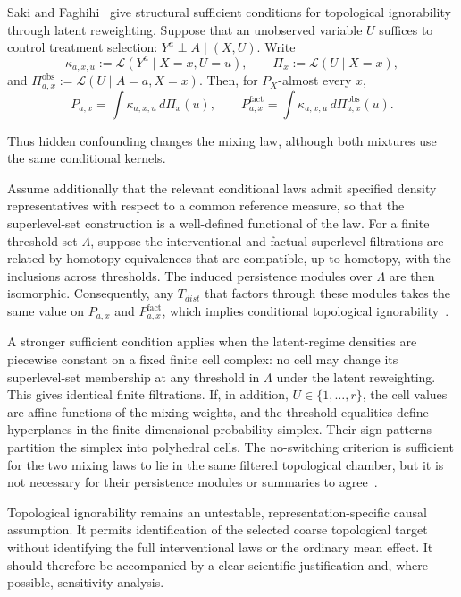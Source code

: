 \documentclass[11pt,a4paper]{article}
\theoremstyle{plain}
\theoremstyle{definition}
\theoremstyle{remark}
\newcommand{\1}{\mathbbm{1}}
\begin{document}
Saki and Faghihi~\citep{sakifaghihi2026} give structural sufficient conditions for topological ignorability through latent reweighting. Suppose that an unobserved variable \(U\) suffices to control treatment selection:
\(Y^a\perp A\mid(X,U)\). Write
\[
\kappa_{a,x,u}
:=
\mathcal L(Y^a\mid X=x,U=u),
\qquad
\Pi_x
:=
\mathcal L(U\mid X=x),
\]
and
\(\Pi^{\mathrm{obs}}_{a,x} := \mathcal L(U\mid A=a,X=x)\). Then, for \(P_X\)-almost every \(x\),
\[
P_{a,x}
=
\int
\kappa_{a,x,u}\,d\Pi_x(u),
\qquad
P^{\mathrm{fact}}_{a,x}
=
\int
\kappa_{a,x,u}\,
d\Pi^{\mathrm{obs}}_{a,x}(u).
\]

Thus hidden confounding changes the mixing law, although both mixtures use the same conditional kernels.

Assume additionally that the relevant conditional laws admit specified density representatives with respect to a common reference measure, so that the superlevel-set construction is a well-defined functional of the law. For a finite threshold set \(\Lambda\), suppose the interventional and factual superlevel filtrations are related by homotopy equivalences that are compatible, up to homotopy, with the inclusions across thresholds. The induced persistence modules over \(\Lambda\) are then isomorphic. Consequently, any $T_{dist}$ that factors through these modules takes the same value on \(P_{a,x}\) and \(P^{\mathrm{fact}}_{a,x}\), which implies conditional topological ignorability~\citep{sakifaghihi2026}.

A stronger sufficient condition applies when the latent-regime densities are piecewise constant on a fixed finite cell complex: no cell may change its superlevel-set membership at any threshold in \(\Lambda\) under the latent reweighting. This gives identical finite filtrations. If, in addition,
\(U\in\{1,\ldots,r\}\), the cell values are affine functions of the mixing weights, and the threshold equalities define hyperplanes in the finite-dimensional probability simplex. Their sign patterns partition the simplex into polyhedral cells. The no-switching criterion is sufficient for the two mixing laws to lie in the same filtered topological chamber, but it is not necessary for their persistence modules or summaries to agree~\citep{sakifaghihi2026}.

Topological ignorability remains an untestable,
representation-specific causal assumption. It permits identification of the selected coarse topological target without identifying the full interventional laws or the ordinary mean effect. It should therefore be accompanied by a clear scientific justification and, where possible, sensitivity analysis.
\end{document}
